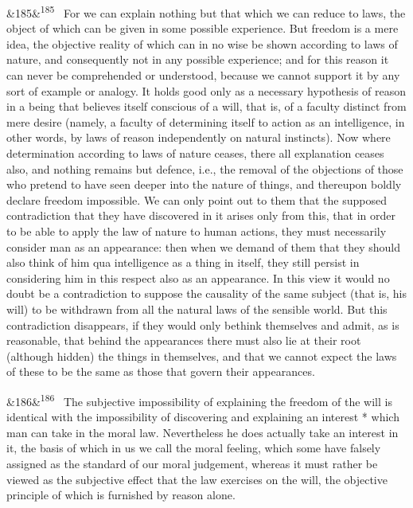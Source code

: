 \documentclass[12pt]{article}
\newcommand{\para}[1][]{\par\noindent\ifx&#1&\else\textsuperscript{\footnotesize #1}~\fi}
\begin{document}
\para[185] For we can explain nothing but that which we can reduce to laws, the object of which can be given in some possible experience. But freedom is a mere idea, the objective reality of which can in no wise be shown according to laws of nature, and consequently not in any possible experience; and for this reason it can never be comprehended or understood, because we cannot support it by any sort of example or analogy. It holds good only as a necessary hypothesis of reason in a being that believes itself conscious of a will, that is, of a faculty distinct from mere desire (namely, a faculty of determining itself to action as an intelligence, in other words, by laws of reason independently on natural instincts). Now where determination according to laws of nature ceases, there all explanation ceases also, and nothing remains but defence, i.e., the removal of the objections of those who pretend to have seen deeper into the nature of things, and thereupon boldly declare freedom impossible. We can only point out to them that the supposed contradiction that they have discovered in it arises only from this, that in order to be able to apply the law of nature to human actions, they must necessarily consider man as an appearance: then when we demand of them that they should also think of him qua intelligence as a thing in itself, they still persist in considering him in this respect also as an appearance. In this view it would no doubt be a contradiction to suppose the causality of the same subject (that is, his will) to be withdrawn from all the natural laws of the sensible world. But this contradiction disappears, if they would only bethink themselves and admit, as is reasonable, that behind the appearances there must also lie at their root (although hidden) the things in themselves, and that we cannot expect the laws of these to be the same as those that govern their appearances.

\para[186] The subjective impossibility of explaining the freedom of the will is identical with the impossibility of discovering and explaining an interest * which man can take in the moral law. Nevertheless he does actually take an interest in it, the basis of which in us we call the moral feeling, which some have falsely assigned as the standard of our moral judgement, whereas it must rather be viewed as the subjective effect that the law exercises on the will, the objective principle of which is furnished by reason alone.
\end{document}
